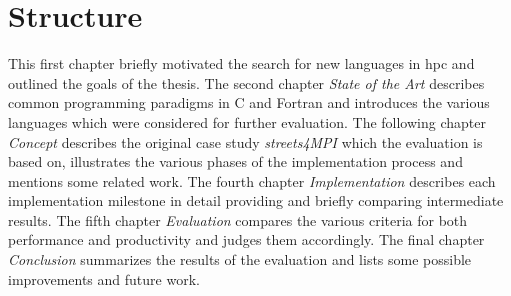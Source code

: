 \section{Structure}
\label{sec:Introduction::Structure}

This first chapter briefly motivated the search for new languages in \gls{hpc} and outlined the goals of the thesis. The second chapter \textit{State of the Art} describes common programming paradigms in C and Fortran and introduces the various languages which were considered for further evaluation. The following chapter \textit{Concept} describes the original case study \textit{streets4MPI} which the evaluation is based on, illustrates the various phases of the implementation process and mentions some related work. The fourth chapter \textit{Implementation} describes each implementation milestone in detail providing and briefly comparing intermediate results. The fifth chapter \textit{Evaluation} compares the various criteria for both performance and productivity and judges them accordingly. The final chapter \textit{Conclusion} summarizes the results of the evaluation and lists some possible improvements and future work.
